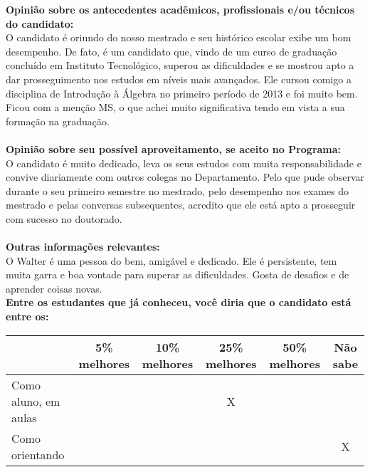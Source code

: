 \documentclass[11pt]{article}
\begin{document}
\textbf{Opinião sobre os antecedentes acadêmicos, profissionais e/ou técnicos do candidato:}
\\O candidato é oriundo do nosso mestrado e seu histórico escolar exibe um bom desempenho. De fato, é um candidato que, vindo de um curso de graduação concluído em Instituto Tecnológico, superou as dificuldades e se mostrou apto a dar prosseguimento nos estudos em níveis mais avançados.  Ele cursou comigo a disciplina de Introdução à Álgebra no primeiro período de 2013 e foi muito bem. Ficou com a menção MS, o que achei muito significativa tendo em vista a sua formação na graduação.  \\
\\
\textbf{Opinião sobre seu possível aproveitamento, se aceito no Programa:}
\\O candidato é muito dedicado, leva os seus estudos com muita responsabilidade e convive diariamente com outros colegas no Departamento. Pelo que pude observar durante o seu primeiro semestre no mestrado, pelo desempenho nos exames do mestrado e pelas conversas subsequentes, acredito que ele está apto a prosseguir com sucesso no doutorado.\\ 
\\
\textbf{Outras informações relevantes:} \\O Walter é uma pessoa do bem, amigável e dedicado. Ele é persistente, tem muita garra e boa vontade para superar as dificuldades. Gosta de desafios e de aprender coisas novas. 
\\[0.3cm]
\textbf{Entre os estudantes que já conheceu, você diria que o candidato está entre os:}
\\
\begin{tabular}{|l|c|c|c|c|c|}
\hline
 & 5\% melhores & 10\% melhores & 25\% melhores & 50\% melhores & Não sabe \\
\hline
Como aluno, em aulas &  &  & X &  & \\
\hline
Como orientando &  &  &  &  & X\\
\hline
\end{tabular}
\end{document}

